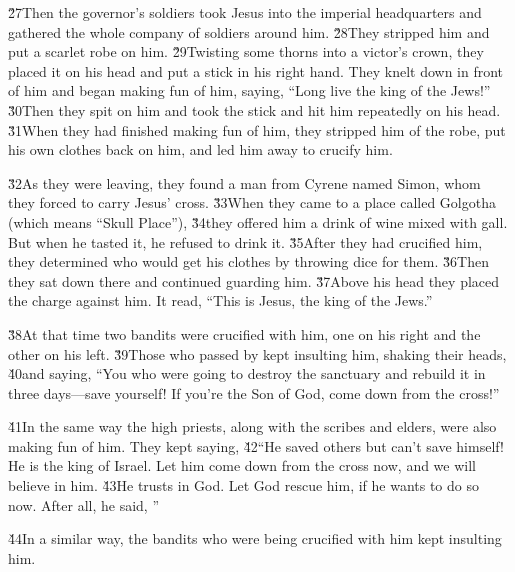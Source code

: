 \v{27}Then the governor's soldiers took Jesus into the imperial headquarters and gathered the whole company of soldiers around him. \v{28}They stripped him and put a scarlet robe on him. \v{29}Twisting some thorns into a victor's crown, they placed it on his head and put a stick in his right hand. They knelt down in front of him and began making fun of him, saying, ``Long live the king of the Jews!'' \v{30}Then they spit on him and took the stick and hit him repeatedly on his head. \v{31}When they had finished making fun of him, they stripped him of the robe, put his own clothes back on him, and led him away to crucify him.

\v{32}As they were leaving, they found a man from Cyrene named Simon, whom they forced to carry Jesus' cross. \v{33}When they came to a place called Golgotha (which means ``Skull Place''), \v{34}they offered him a drink of wine mixed with gall. But when he tasted it, he refused to drink it. \v{35}After they had crucified him, they determined who would get his clothes by throwing dice for them. \v{36}Then they sat down there and continued guarding him. \v{37}Above his head they placed the charge against him. It read, ``This is Jesus, the king of the Jews.''

\v{38}At that time two bandits were crucified with him, one on his right and the other on his left. \v{39}Those who passed by kept insulting him, shaking their heads, \v{40}and saying, ``You who were going to destroy the sanctuary and rebuild it in three days---save yourself! If you're the Son of God, come down from the cross!''

\v{41}In the same way the high priests, along with the scribes and elders, were also making fun of him. They kept saying, \v{42}``He saved others but can't save himself! He is the king of Israel. Let him come down from the cross now, and we will believe in him. \v{43}He trusts in God. Let God rescue him, if he wants to do so now. After all, he said, ''

\v{44}In a similar way, the bandits who were being crucified with him kept insulting him.


